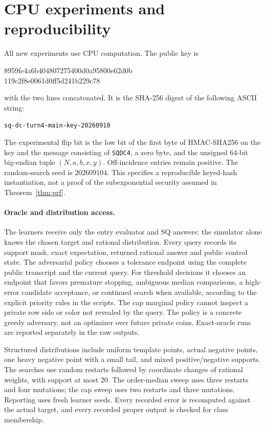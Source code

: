 \section{CPU experiments and reproducibility}\label{app:experiments}
All new experiments use CPU computation. The public key is
\begin{center}\small\ttfamily
8959fe4a6b404807275400d0a95800e62d0b\\
119c2f8e0061d0ff5d241b229c78
\end{center}
with the two lines concatenated. It is the SHA-256 digest of the following ASCII string:\begin{center}\small\texttt{sq-dc-turn4-main-key-20260910}\end{center} The experimental flip bit is the low bit of the first byte of HMAC-SHA256 on the key and the message consisting of \texttt{SQDC4}, a zero byte, and the unsigned 64-bit big-endian tuple $(N,a,b,x,y)$. Off-incidence entries remain positive. The random-search seed is $202609104$. This specifies a reproducible keyed-hash instantiation, not a proof of the subexponential security assumed in Theorem~\ref{thm:prf}.

\paragraph{Oracle and distribution access.}
The learners receive only the entry evaluator and SQ answers; the simulator alone knows the chosen target and rational distribution. Every query records its support mask, exact expectation, returned rational answer and public control state. The adversarial policy chooses a tolerance endpoint using the complete public transcript and the current query. For threshold decisions it chooses an endpoint that favors premature stopping, ambiguous median comparisons, a high-error candidate acceptance, or continued search when available, according to the explicit priority rules in the scripts. The cap marginal policy cannot inspect a private row side or color not revealed by the query. The policy is a concrete greedy adversary, not an optimizer over future private coins. Exact-oracle runs are reported separately in the raw outputs.

Structured distributions include uniform template points, actual negative points, one heavy negative point with a small tail, and mixed positive/negative supports. The searches use random restarts followed by coordinate changes of rational weights, with support at most 20. The order-median sweep uses three restarts and four mutations; the cap sweep uses two restarts and three mutations. Reporting uses fresh learner seeds. Every recorded error is recomputed against the actual target, and every recorded proper output is checked for class membership.

